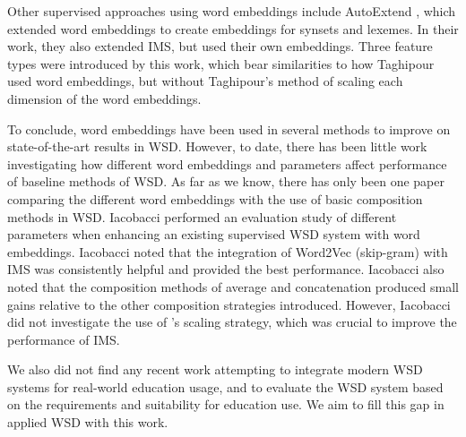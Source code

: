 Other supervised approaches using word embeddings include AutoExtend
\cite{rothe2015autoextend}, which extended word embeddings to create
embeddings for synsets and lexemes. In their work, they also extended
IMS, but used their own embeddings. Three feature types were
introduced by this work, which bear similarities to how Taghipour used
word embeddings, but without Taghipour's method of scaling each
dimension of the word embeddings.


To conclude, word embeddings have been used in several methods to
improve on state-of-the-art results in WSD. However, to date, there
has been little work investigating how different word embeddings and
parameters affect performance of baseline methods of WSD. As far as we
know, there has only been one paper comparing the different word
embeddings with the use of basic composition methods in WSD. Iacobacci
 performed an evaluation study of different
parameters when enhancing an existing supervised WSD system with word
embeddings. Iacobacci noted that the integration of Word2Vec
(skip-gram) with IMS was consistently helpful and provided the best
performance. Iacobacci also noted that the composition methods of
average and concatenation produced small gains relative to the other
composition strategies introduced. However, Iacobacci did not
investigate the use of \cite{Taghipour15}'s scaling strategy, which
was crucial to improve the performance of IMS.

We also did not find any recent work attempting to integrate modern
WSD systems for real-world education usage, and to evaluate the WSD
system based on the requirements and suitability for education use.
We aim to fill this gap in applied WSD with this work.
